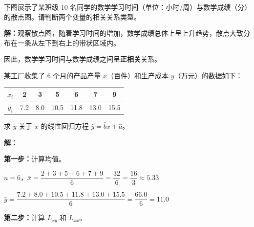 \documentclass[12pt, a4paper]{ctexart}
\begin{document}
\bigskip

\begin{examplebox}[【例2】由散点图判断相关性]
下图展示了某班级 $10$ 名同学的数学学习时间（单位：小时/周）与数学成绩（分）的散点图。请判断两个变量的相关关系类型。

\begin{center}
\end{center}
\end{examplebox}

\textbf{解：}观察散点图，随着学习时间的增加，数学成绩总体上呈上升趋势，散点大致分布在一条从左下到右上的带状区域内。

因此，数学学习时间与数学成绩之间呈\textbf{正相关}关系。

\bigskip

\begin{examplebox}[【例3】回归直线方程的计算]
某工厂收集了 $6$ 个月的产品产量 $x$（百件）和生产成本 $y$（万元）的数据如下：

\begin{center}
\begin{tabular}{c|cccccc}
\toprule
$x_i$ & 2 & 3 & 5 & 6 & 7 & 9 \\
\midrule
$y_i$ & 7.2 & 8.0 & 10.5 & 11.8 & 13.0 & 15.5 \\
\bottomrule
\end{tabular}
\end{center}

求 $y$ 关于 $x$ 的线性回归方程 $\hat{y} = \hat{b}x + \hat{a}$。
\end{examplebox}

\textbf{解：}

\textbf{第一步：}计算均值。

$n = 6$，$\bar{x} = \dfrac{2+3+5+6+7+9}{6} = \dfrac{32}{6} = \dfrac{16}{3} \approx 5.33$

$\bar{y} = \dfrac{7.2+8.0+10.5+11.8+13.0+15.5}{6} = \dfrac{66.0}{6} = 11.0$

\medskip
\textbf{第二步：}计算 $L_{xy}$ 和 $L_{xx}$。
\end{document}

